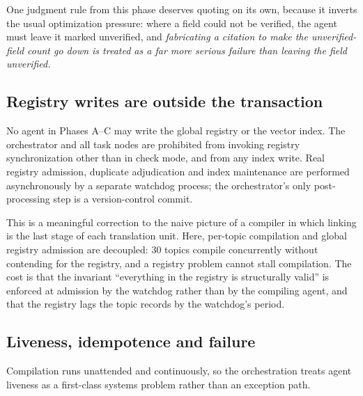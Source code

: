 \documentclass[10pt,a4paper]{article}
\begin{document}
One judgment rule from this phase deserves quoting on its own, because it
inverts the usual optimization pressure: where a field could not be verified, the
agent must leave it marked unverified, and \emph{fabricating a citation to make
the unverified-field count go down is treated as a far more serious failure than
leaving the field unverified.}

\subsection{Registry writes are outside the transaction}
\label{sec:watchdog}

No agent in Phases A--C may write the global registry or the vector index. The
orchestrator and all task nodes are prohibited from invoking registry
synchronization other than in check mode, and from any index write. Real registry
admission, duplicate adjudication and index maintenance are performed
asynchronously by a separate watchdog process; the orchestrator's only
post-processing step is a version-control commit.

This is a meaningful correction to the naive picture of a compiler in which
linking is the last stage of each translation unit. Here, per-topic compilation
and global registry admission are decoupled: 30 topics compile concurrently
without contending for the registry, and a registry problem cannot stall
compilation. The cost is that the invariant ``everything in the registry is
structurally valid'' is enforced at admission by the watchdog rather than by the
compiling agent, and that the registry lags the topic records by the watchdog's
period.

\subsection{Liveness, idempotence and failure}
\label{sec:liveness}

Compilation runs unattended and continuously, so the orchestration treats agent
liveness as a first-class systems problem rather than an exception path.
\end{document}
